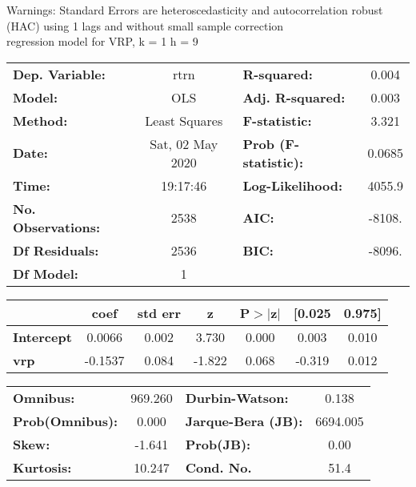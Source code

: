 Warnings: \newline
 [1] Standard Errors are heteroscedasticity and autocorrelation robust (HAC) using 1 lags and without small sample correction\\ 

regression model for VRP, k = 1 h = 9\begin{center}
\begin{tabular}{lclc}
\toprule
\textbf{Dep. Variable:}    &       rtrn       & \textbf{  R-squared:         } &     0.004   \\
\textbf{Model:}            &       OLS        & \textbf{  Adj. R-squared:    } &     0.003   \\
\textbf{Method:}           &  Least Squares   & \textbf{  F-statistic:       } &     3.321   \\
\textbf{Date:}             & Sat, 02 May 2020 & \textbf{  Prob (F-statistic):} &   0.0685    \\
\textbf{Time:}             &     19:17:46     & \textbf{  Log-Likelihood:    } &    4055.9   \\
\textbf{No. Observations:} &        2538      & \textbf{  AIC:               } &    -8108.   \\
\textbf{Df Residuals:}     &        2536      & \textbf{  BIC:               } &    -8096.   \\
\textbf{Df Model:}         &           1      & \textbf{                     } &             \\
\bottomrule
\end{tabular}
\begin{tabular}{lcccccc}
                   & \textbf{coef} & \textbf{std err} & \textbf{z} & \textbf{P$> |$z$|$} & \textbf{[0.025} & \textbf{0.975]}  \\
\midrule
\textbf{Intercept} &       0.0066  &        0.002     &     3.730  &         0.000        &        0.003    &        0.010     \\
\textbf{vrp}       &      -0.1537  &        0.084     &    -1.822  &         0.068        &       -0.319    &        0.012     \\
\bottomrule
\end{tabular}
\begin{tabular}{lclc}
\textbf{Omnibus:}       & 969.260 & \textbf{  Durbin-Watson:     } &    0.138  \\
\textbf{Prob(Omnibus):} &   0.000 & \textbf{  Jarque-Bera (JB):  } & 6694.005  \\
\textbf{Skew:}          &  -1.641 & \textbf{  Prob(JB):          } &     0.00  \\
\textbf{Kurtosis:}      &  10.247 & \textbf{  Cond. No.          } &     51.4  \\
\bottomrule
\end{tabular}
\end{center}


